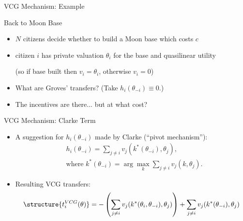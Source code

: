 \documentclass[english,10pt
,aspectratio=169
]{beamer}
\begin{document}
\begin{frame}{VCG Mechanism: Example}
\begin{exampleblock}{Back to Moon Base}
	\begin{itemize}
		\item $N$ citizens decide whether to build a Moon base which costs $c$
		\item citizen $i$ has private valuation $\theta_{i}$ for the base and quasilinear utility
		
		(so if base built then $v_i = \theta_i$, otherwise $v_i = 0$)
	\end{itemize}
\end{exampleblock}
\begin{itemize}
	\item What are Groves' transfers{\tiny\texttrademark}? (Take $h_i(\theta_{-i}) \equiv 0$.)
	\item The incentives are there... but at what cost?
\end{itemize}
\end{frame}


\begin{frame}{VCG Mechanism: Clarke Term}
\begin{itemize}
	\item A suggestion for $h_i(\theta_{-i})$ made by Clarke (``pivot mechanism''):
	\vspace{-0.5em}\begin{align*}
	&h_{i}(\theta_{-i})=\sum_{j\neq i} v_{j}(k^*(\theta_{-i}),\theta_{j}),
	\\ &\text{where } k^*(\theta_{-i}) = \arg\max_{k} \sum_{j\neq i}v_{j}(k,\theta_{j}).
	\end{align*}
	\item Resulting \alert{VCG transfers}:
	\vspace{-0.5em}\begin{align*}
	\structure{ t_{i}^{VCG}(\theta) } = -\left(\sum_{j\neq i} v_{j}(k^*(\theta_i, \theta_{-i}), \theta_{j}) \right) + \sum_{j\neq i} v_{j}(k^*(\theta_{-i}), \theta_{j})
	\end{align*}
\end{itemize}
\end{frame}
\end{document}
